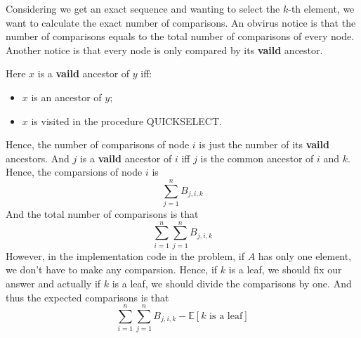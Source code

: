 Considering we get an exact sequence and wanting to select the $k$-th element, we want to calculate the exact number of comparisons. An obvirus notice is that the number of comparisons equals to the total number of comparisons of every node. Another notice is that every node is only compared by its \textbf{vaild} ancestor. 
	
\noindent Here $x$ is a \textbf{vaild} ancestor of $y$ iff:
\begin{itemize}
	\item $x$ is an ancestor of $y$;
	\item $x$ is visited in the procedure QUICKSELECT.
\end{itemize}
\noindent Hence, the number of comparisons of node $i$ is just the number of its \textbf{vaild} ancestors. And $j$ is a \textbf{vaild} ancestor of $i$ iff $j$ is the common ancestor of $i$ and $k$.
\noindent Hence, the comparsions of node $i$ is
\[\sum_{j = 1}^{n} B_{j, i, k}\]
\noindent And the total number of comparisons is that
\[\sum_{i = 1}^{n} \sum_{j = 1}^{n} B_{j, i, k}\]
\noindent However, in the implementation code in the problem, if $A$ has only one element, we don't have to make any comparsion. Hence, if $k$ is a leaf, we should fix our answer and actually if $k$ is a leaf, we should divide the comparisons by one. And thus the expected comparisons is that
\[\sum_{i = 1}^{n} \sum_{j = 1}^{n} B_{j, i, k} - \mathbb{E}[k\text{~is~a~leaf}]\]
